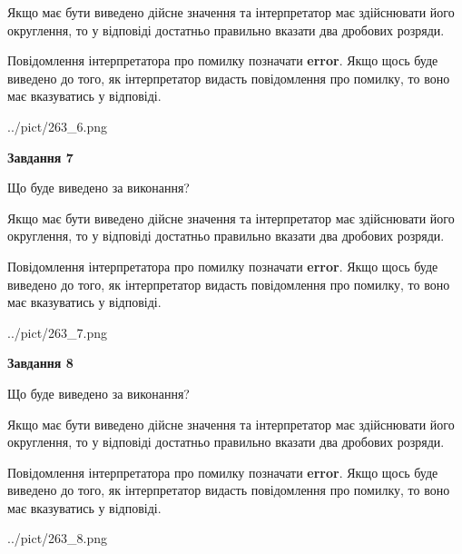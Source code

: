 \documentclass[12pt, ukrainian]{article}
\begin{document}
{\begin {Large}
Якщо має бути виведено дійсне значення та інтерпретатор має здійснювати його округлення, 
то у відповіді достатньо правильно вказати два дробових розряди.

Повідомлення інтерпретатора про помилку позначати \textbf{error}.
Якщо щось буде виведено до того, як інтерпретатор видасть повідомлення про помилку, 
то воно має вказуватись у відповіді. \par

\begin{center}
	{../pict/263_6.png}
\end{center}
\newpage

{\begin {center}\textbf{Завдання 7}\end {center}}\par
Що буде виведено за виконання? \par

Якщо має бути виведено дійсне значення та інтерпретатор має здійснювати його округлення, 
то у відповіді достатньо правильно вказати два дробових розряди.

Повідомлення інтерпретатора про помилку позначати \textbf{error}.
Якщо щось буде виведено до того, як інтерпретатор видасть повідомлення про помилку, 
то воно має вказуватись у відповіді. \par

\begin{center}
	{../pict/263_7.png}
\end{center}
\newpage

{\begin {center}\textbf{Завдання 8}\end {center}}\par
Що буде виведено за виконання? \par

Якщо має бути виведено дійсне значення та інтерпретатор має здійснювати його округлення, 
то у відповіді достатньо правильно вказати два дробових розряди.

Повідомлення інтерпретатора про помилку позначати \textbf{error}.
Якщо щось буде виведено до того, як інтерпретатор видасть повідомлення про помилку, 
то воно має вказуватись у відповіді. \par

\begin{center}
	{../pict/263_8.png}
\end{center}
\newpage


\end{Large}}
\end{document}
